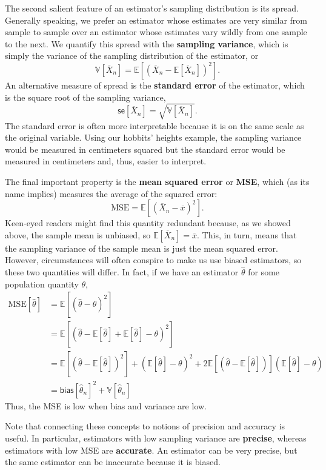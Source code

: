 \documentclass[
  13pt,
  letterpaper,
  DIV=11,
  numbers=noendperiod]{scrreprt}
\newcommand{\E}{\mathbb{E}}
\newcommand{\V}{\mathbb{V}}
\newcommand{\se}{\textsf{se}}
\newcommand{\Xbar}{\overline{X}}
\theoremstyle{plain}
\theoremstyle{plain}
\theoremstyle{definition}
\theoremstyle{definition}
\theoremstyle{remark}
\begin{document}
The second salient feature of an estimator's sampling distribution is
its spread. Generally speaking, we prefer an estimator whose estimates
are very similar from sample to sample over an estimator whose estimates
vary wildly from one sample to the next. We quantify this spread with
the \textbf{sampling variance}, which is simply the variance of the
sampling distribution of the estimator, or \[
\V[\Xbar_n] = \E[(\Xbar_n - \E[\Xbar_n])^2].
\] An alternative measure of spread is the \textbf{standard error} of
the estimator, which is the square root of the sampling variance, \[
\se[\Xbar_n] = \sqrt{\V[\Xbar_n]}.
\] The standard error is often more interpretable because it is on the
same scale as the original variable. Using our hobbits' heights example,
the sampling variance would be measured in centimeters squared but the
standard error would be measured in centimeters and, thus, easier to
interpret.

The final important property is the \textbf{mean squared error} or
\textbf{MSE}, which (as its name implies) measures the average of the
squared error: \[
\text{MSE} = \E[(\Xbar_n-\overline{x})^2].
\] Keen-eyed readers might find this quantity redundant because, as we
showed above, the sample mean is unbiased, so
\(\E[\Xbar_n] = \overline{x}\). This, in turn, means that the sampling
variance of the sample mean is just the mean squared error. However,
circumstances will often conspire to make us use biased estimators, so
these two quantities will differ. In fact, if we have an estimator
\(\widehat{\theta}\) for some population quantity \(\theta\), \[ 
\begin{aligned}
\text{MSE}[\widehat{\theta}] &= \E[(\widehat{\theta} - \theta)^2] \\
&= \E[(\widehat{\theta} - \E[\widehat{\theta}] + \E[\widehat{\theta}] - \theta)^2] \\
&= \E[(\widehat{\theta} - \E[\widehat{\theta}])^2] + \left(\E[\widehat{\theta}] - \theta\right) ^ 2 + 2\E[(\widehat{\theta} - \E[\widehat{\theta}])]\left(\E[\widehat{\theta}] - \theta\right) \\
&= \textsf{bias}[\widehat{\theta}_n]^2 + \V[\widehat{\theta}_n]  
\end{aligned}
\] Thus, the MSE is low when bias and variance are low.

Note that connecting these concepts to notions of precision and accuracy
is useful. In particular, estimators with low sampling variance are
\textbf{precise}, whereas estimators with low MSE are \textbf{accurate}.
An estimator can be very precise, but the same estimator can be
inaccurate because it is biased.
\end{document}
